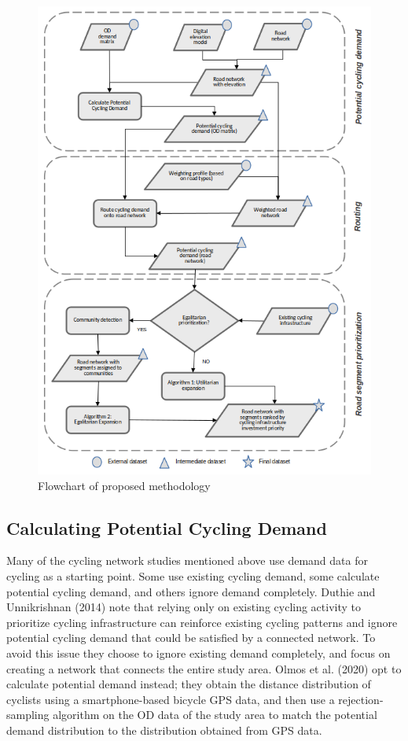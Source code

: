 \documentclass[
]{article}
\begin{document}
\begin{figure}

{\centering \includegraphics[width=0.8\linewidth]{extras/methodology_flowchart} 

}

\caption{Flowchart of proposed methodology}\label{fig:methodflowchart}
\end{figure}

\hypertarget{calculating-potential-cycling-demand}{%
\subsection{Calculating Potential Cycling Demand}\label{calculating-potential-cycling-demand}}

Many of the cycling network studies mentioned above use demand data for cycling as a starting point.
Some use existing cycling demand, some calculate potential cycling demand, and others ignore demand completely.
Duthie and Unnikrishnan (2014) note that relying only on existing cycling activity to prioritize cycling infrastructure can reinforce existing cycling patterns and ignore potential cycling demand that could be satisfied by a connected network.
To avoid this issue they choose to ignore existing demand completely, and focus on creating a network that connects the entire study area.
Olmos et al. (2020) opt to calculate potential demand instead; they obtain the distance distribution of cyclists using a smartphone-based bicycle GPS data, and then use a rejection-sampling algorithm on the OD data of the study area to match the potential demand distribution to the distribution obtained from GPS data.
\end{document}
